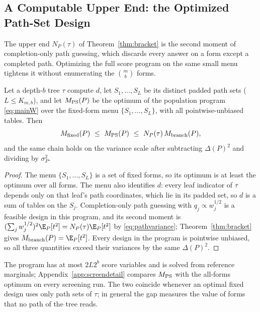 \subsection{A Computable Upper End: the Optimized Path-Set Design}\label{app:upper}
The upper end $N_P(\tau)$ of Theorem~\ref{thm:bracket} is the second moment of completion-only path guessing, which discards every answer on a form except a completed path. Optimizing the full score program on the same small menu tightens it without enumerating the $\binom mb$ forms.

\begin{proposition}\label{prop:upper}
Let a depth-$b$ tree $\tau$ compute $d$, let $S_1,\ldots,S_L$ be its distinct padded path sets ($L\le K_{m,b}$), and let $M_{\rm PS}(P)$ be the optimum of the population program \eqref{eq:mainW} over the fixed-form menu $\{S_1,\ldots,S_L\}$, with all pointwise-unbiased tables. Then
\[
 M_{\rm fixed}(P)\ \le\ M_{\rm PS}(P)\ \le\ N_P(\tau)\,M_{\rm branch}(P),
\]
and the same chain holds on the variance scale after subtracting $\Delta(P)^2$ and dividing by $\sigma_P^2$.
\end{proposition}
\begin{proof}
The menu $\{S_1,\ldots,S_L\}$ is a set of fixed forms, so its optimum is at least the optimum over all forms. The menu also identifies $d$: every leaf indicator of $\tau$ depends only on that leaf's path coordinates, which lie in its padded set, so $d$ is a sum of tables on the $S_j$. Completion-only path guessing with $q_j\propto w_j^{1/2}$ is a feasible design in this program, and its second moment is $(\sum_jw_j^{1/2})^2\E_P[t^2]=N_P(\tau)\E_P[t^2]$ by \eqref{eq:pathvariance}; Theorem~\ref{thm:bracket} gives $M_{\rm branch}(P)=\E_P[t^2]$. Every design in the program is pointwise unbiased, so all three quantities exceed their variances by the same $\Delta(P)^2$.
\end{proof}
The program has at most $2L2^b$ score variables and is solved from reference marginals; Appendix~\ref{app:screendetail} compares $M_{\rm PS}$ with the all-forms optimum on every screening run. The two coincide whenever an optimal fixed design uses only path sets of $\tau$; in general the gap measures the value of forms that no path of the tree reads.
